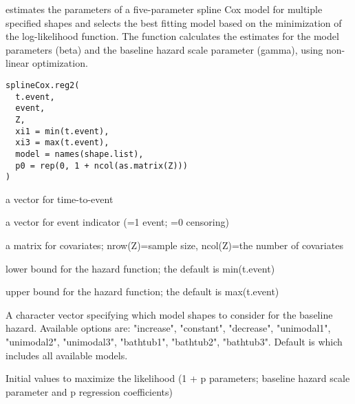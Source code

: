 \documentclass[a4paper]{book}
\begin{document}
%
\begin{Examples}
\end{Examples}
%
\begin{Description}\relax
{} estimates the parameters of a five-parameter spline Cox model for multiple specified shapes
and selects the best fitting model based on the minimization of the log-likelihood function.
The function calculates the estimates for the model parameters (beta) and the baseline hazard scale parameter (gamma), using non-linear optimization.
\end{Description}
%
\begin{Usage}
\begin{verbatim}
splineCox.reg2(
  t.event,
  event,
  Z,
  xi1 = min(t.event),
  xi3 = max(t.event),
  model = names(shape.list),
  p0 = rep(0, 1 + ncol(as.matrix(Z)))
)
\end{verbatim}
\end{Usage}
%
\begin{Arguments}
\begin{ldescription}
\item[\code{t.event}] a vector for time-to-event

\item[\code{event}] a vector for event indicator (=1 event; =0 censoring)

\item[\code{Z}] a matrix for covariates; nrow(Z)=sample size, ncol(Z)=the number of covariates

\item[\code{xi1}] lower bound for the hazard function; the default is min(t.event)

\item[\code{xi3}] upper bound for the hazard function; the default is max(t.event)

\item[\code{model}] A character vector specifying which model shapes to consider for the baseline hazard.
Available options are:
"increase", "constant", "decrease", "unimodal1", "unimodal2", "unimodal3", "bathtub1", "bathtub2", "bathtub3".
Default is  which includes all available models.

\item[\code{p0}] Initial values to maximize the likelihood (1 + p parameters; baseline hazard scale parameter and p regression coefficients)
\end{ldescription}
\end{Arguments}
\end{document}
